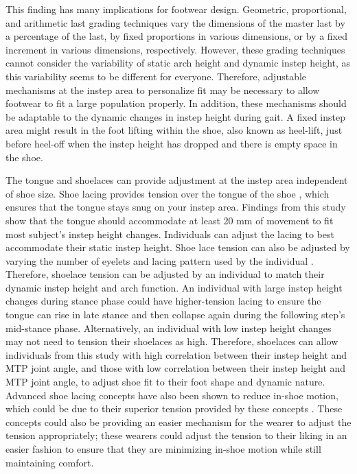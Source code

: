 \documentclass[defaultstyle,11pt]{thesis}
\begin{document}
This finding has many implications for footwear design. Geometric, proportional, and arithmetic last grading techniques vary the dimensions of the master last by a percentage of the last, by fixed proportions in various dimensions, or by a fixed increment in various dimensions, respectively.
However, these grading techniques cannot consider the variability of static arch height and dynamic instep height, as this variability seems to be different for everyone.
Therefore, adjustable mechanisms at the instep area to personalize fit may be necessary to allow footwear to fit a large population properly.
In addition, these mechanisms should be adaptable to the dynamic changes in instep height during gait.
A fixed instep area might result in the foot lifting within the shoe, also known as heel-lift, just before heel-off when the instep height has dropped and there is empty space in the shoe.

The tongue and shoelaces can provide adjustment at the instep area independent of shoe size.
Shoe lacing provides tension over the tongue of the shoe \citep{Hagen2009, Polster2002}, which ensures that the tongue stays snug on your instep area.
Findings from this study show that the tongue should accommodate at least 20 mm of movement to fit most subject's instep height changes.
Individuals can adjust the lacing to best accommodate their static instep height.
Shoe lace tension can also be adjusted by varying the number of eyelets and lacing pattern used by the individual \citep{Hagen2009, Hagen2010}.
Therefore, shoelace tension can be adjusted by an individual to match their dynamic instep height and arch function.
An individual with large instep height changes during stance phase could have higher-tension lacing to ensure the tongue can rise in late stance and then collapse again during the following step's mid-stance phase.
Alternatively, an individual with low instep height changes may not need to tension their shoelaces as high.
Therefore, shoelaces can allow individuals from this study with high correlation between their instep height and MTP joint angle, and those with low correlation between their instep height and MTP joint angle, to adjust shoe fit to their foot shape and dynamic nature.
Advanced shoe lacing concepts have also been shown to reduce in-shoe motion, which could be due to their superior tension provided by these concepts \citep{Pryhoda2021, Myers2019}.
These concepts could also be providing an easier mechanism for the wearer to adjust the tension appropriately; these wearers could adjust the tension to their liking in an easier fashion to ensure that they are minimizing in-shoe motion while still maintaining comfort.
\end{document}
